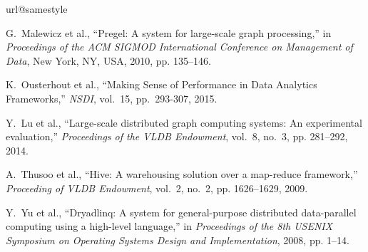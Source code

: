 \documentclass[10pt,journal,compsoc]{IEEEtran}
\begin{document}
% 
% 
%
\begin{thebibliography}{44}
\providecommand{\url}[1]{#1}
\csname url@samestyle\endcsname
\providecommand{\newblock}{\relax}
\providecommand{\bibinfo}[2]{#2}
\providecommand{\BIBentrySTDinterwordspacing}{\spaceskip=0pt\relax}
\providecommand{\BIBentryALTinterwordstretchfactor}{4}
\providecommand{\BIBentryALTinterwordspacing}{\spaceskip=\fontdimen2\font plus
\BIBentryALTinterwordstretchfactor\fontdimen3\font minus
  \fontdimen4\font\relax}
\providecommand{\BIBforeignlanguage}[2]{{%
\expandafter\ifx\csname l@#1\endcsname\relax
\typeout{** WARNING: IEEEtran.bst: No hyphenation pattern has been}%
\typeout{** loaded for the language `#1'. Using the pattern for}%
\typeout{** the default language instead.}%
\else
\language=\csname l@#1\endcsname
\fi
#2}}
\providecommand{\BIBdecl}{\relax}
\BIBdecl

G.~Malewicz et al., ``Pregel: A system for large-scale graph processing,'' in
  \emph{Proceedings of the ACM SIGMOD International Conference on Management of
  Data}, New York, NY, USA, 2010, pp. 135--146.

K.~Ousterhout et al., ``Making Sense of Performance in Data Analytics Frameworks,'' \emph{NSDI}, vol.~15, pp.~293-307, 2015.

Y.~Lu et al., ``Large-scale distributed graph computing
  systems: An experimental evaluation,'' \emph{Proceedings of the VLDB
  Endowment}, vol.~8, no.~3, pp. 281--292, 2014.

A.~Thusoo et al., ``Hive: A warehousing solution over a map-reduce
  framework,'' \emph{Proceeding of VLDB Endowment}, vol.~2, no.~2, pp.
  1626--1629, 2009.

Y.~Yu et al., ``Dryadlinq: A system for general-purpose distributed
  data-parallel computing using a high-level language,'' in \emph{Proceedings
  of the 8th USENIX Symposium on Operating Systems Design and Implementation},
  2008, pp. 1--14.


\end{thebibliography}
\end{document}
